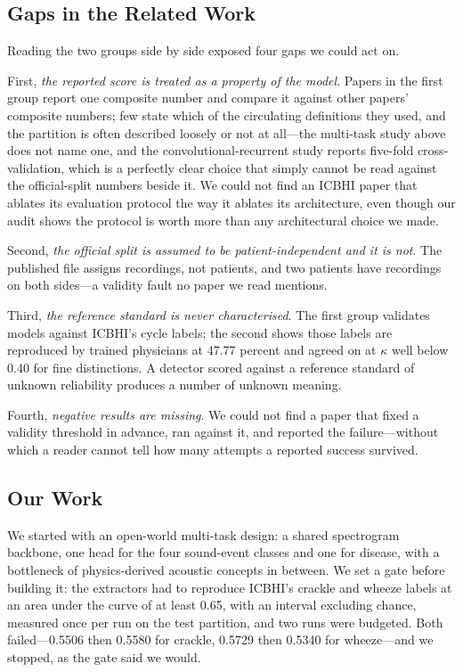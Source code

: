 \documentclass[journal,onecolumn]{IEEEtran}
\begin{document}
\subsection{Gaps in the Related Work}
\label{subsec:gaps}

Reading the two groups side by side exposed four gaps we could act on.

First, \emph{the reported score is treated as a property of the model}. Papers in the first
group report one composite number and compare it against other papers' composite numbers; few
state which of the circulating definitions they used, and the partition is often described
loosely or not at all---the multi-task study above does not name one, and the
convolutional-recurrent study reports five-fold cross-validation, which is a perfectly clear
choice that simply cannot be read against the official-split numbers beside it. We could not
find an ICBHI paper that ablates its evaluation protocol the way it ablates its architecture,
even though our audit shows the protocol is worth more than any architectural choice we made.

Second, \emph{the official split is assumed to be patient-independent and it is not}. The
published file assigns recordings, not patients, and two patients have recordings on both
sides---a validity fault no paper we read mentions.

Third, \emph{the reference standard is never characterised}. The first group validates models
against ICBHI's cycle labels; the second shows those labels are reproduced by trained
physicians at 47.77 percent and agreed on at $\kappa$ well below 0.40 for fine distinctions. A
detector scored against a reference standard of unknown reliability produces a number of
unknown meaning.

Fourth, \emph{negative results are missing}. We could not find a paper that fixed a validity
threshold in advance, ran against it, and reported the failure---without which a reader cannot
tell how many attempts a reported success survived.

\subsection{Our Work}
\label{subsec:ourwork}

We started with an open-world multi-task design: a shared spectrogram backbone, one head for
the four sound-event classes and one for disease, with a bottleneck of physics-derived acoustic
concepts in between. We set a gate before building it: the extractors had to reproduce ICBHI's
crackle and wheeze labels at an area under the curve of at least 0.65, with an interval
excluding chance, measured once per run on the test partition, and two runs were budgeted. Both
failed---0.5506 then 0.5580 for crackle, 0.5729 then 0.5340 for wheeze---and we stopped, as the
gate said we would.
\end{document}
